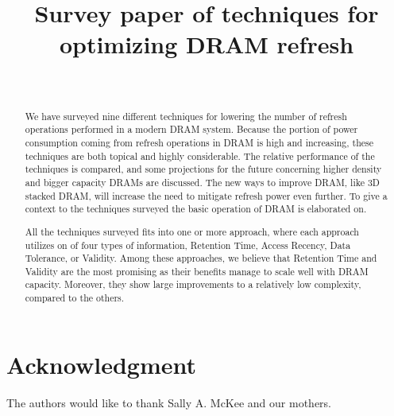 \documentclass[journal, a4paper]{IEEEtran}
\begin{document}
\title{Survey paper of techniques for optimizing DRAM refresh}

\author{\\
}

\maketitle


\begin{abstract}
We have surveyed nine different techniques for lowering the number of refresh operations performed in a modern DRAM system. Because the portion of power consumption coming from refresh operations in DRAM is high and increasing, these techniques are both topical and highly considerable. The relative performance of the techniques is compared, and some projections for the future concerning higher density and bigger capacity DRAMs are discussed. The new ways to improve DRAM, like 3D stacked DRAM, will increase the need to mitigate refresh power even further. To give a context to the techniques surveyed the basic operation of DRAM is elaborated on. 

All the techniques surveyed fits into one or more approach, where each approach utilizes on of four types of information, Retention Time, Access Recency, Data Tolerance, or Validity. Among these approaches, we believe that Retention Time and Validity are the most promising as their benefits manage to scale well with DRAM capacity. Moreover, they show large improvements to a relatively low complexity, compared to the others.
\end{abstract}







\section*{Acknowledgment}
The authors would like to thank Sally A. McKee and our mothers.



\IEEEtriggercmd{\newpage}




\end{document}
